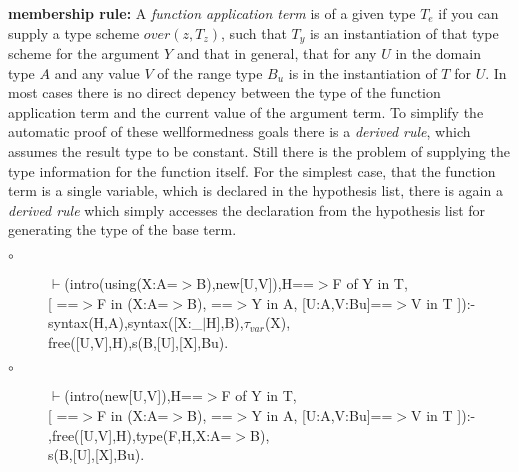 \documentclass[11pt]{report}
\begin{document}
\begin{enumerate}
 {\bf membership rule:}
 A \emph{function application term} is of a given type $T_e$ if you can
 supply a type scheme $over(z,T_z)$, such that $T_y$ is an
 instantiation of that type scheme for the argument $Y$ 
 and that in general, that for any $U$ in the domain
 type $A$ and any value $V$ of the range type $B_u$ is in the
 instantiation of $T$ for $U$. In most cases there is no direct
 depency between the type of the function application term and the 
 current value of the argument term. To simplify
 the automatic proof of these wellformedness goals there is
 a \emph{derived rule}, which assumes the result type to be constant.
 Still there is the problem of
 supplying the type information for the function itself. For the
 simplest case, that the function term is a single variable, which
 is declared in the hypothesis list, there is again a \emph{derived 
 rule} which simply accesses the declaration from the hypothesis
 list for generating the type of the base term.
  
 \begin{description}
 \item[$\circ$]
\begin{sf}\begin{tabbing}
$\vdash$(intro(using(X:A=$>$B),new[U,V]),H==$>$F of Y in T,\\[-0.15ex]
\hspace{2em}[ ==$>$F in (X:A=$>$B), ==$>$Y in A, [U:A,V:Bu]==$>$V in T ]):-\\[-0.15ex]
\hspace{2em}syntax(H,A),syntax([X:\_\hspace{0.1em}$\mid$H],B),$\tau_{var}$(X),\\[-0.15ex]
\hspace{2em}free([U,V],H),s(B,[U],[X],Bu).
\end{tabbing}\end{sf}

 \item[$\circ$]
\begin{sf}\begin{tabbing}
$\vdash$(intro(new[U,V]),H==$>$F of Y in T, \\[-0.15ex]
\hspace{2em}[ ==$>$F in (X:A=$>$B), ==$>$Y in A, [U:A,V:Bu]==$>$V in T ]):-\\[-0.15ex]
\hspace{2em}{\bf derived},free([U,V],H),type(F,H,X:A=$>$B),\\[-0.15ex]
\hspace{2em}s(B,[U],[X],Bu). 
\end{tabbing}\end{sf}


\end{description}
\end{enumerate}
\end{document}
